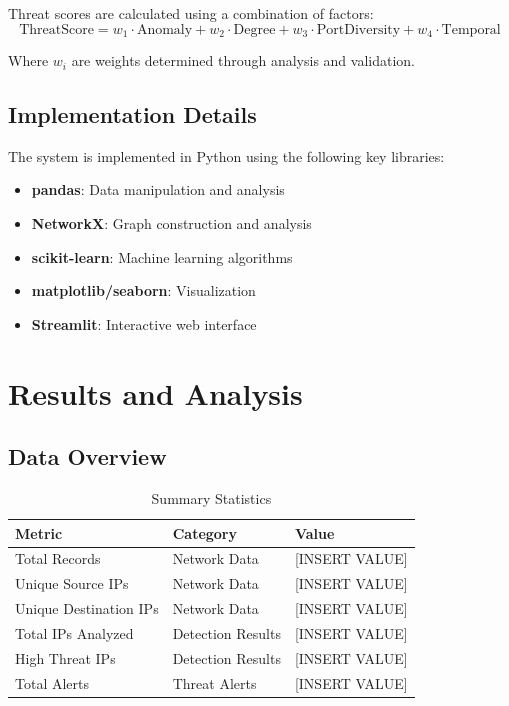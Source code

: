 \documentclass[12pt,a4paper]{report}
\begin{document}
Threat scores are calculated using a combination of factors:
\begin{equation}
\text{ThreatScore} = w_1 \cdot \text{Anomaly} + w_2 \cdot \text{Degree} + w_3 \cdot \text{PortDiversity} + w_4 \cdot \text{Temporal}
\end{equation}

Where $w_i$ are weights determined through analysis and validation.

\section{Implementation Details}

The system is implemented in Python using the following key libraries:

\begin{itemize}
    \item \textbf{pandas}: Data manipulation and analysis
    \item \textbf{NetworkX}: Graph construction and analysis
    \item \textbf{scikit-learn}: Machine learning algorithms
    \item \textbf{matplotlib/seaborn}: Visualization
    \item \textbf{Streamlit}: Interactive web interface
\end{itemize}

\chapter{Results and Analysis}

\section{Data Overview}

\begin{table}[H]
\centering
\caption{Summary Statistics}
\begin{tabularx}{\textwidth}{|l|X|X|}
\hline
\textbf{Metric} & \textbf{Category} & \textbf{Value} \\
\hline
Total Records & Network Data & [INSERT VALUE] \\
\hline
Unique Source IPs & Network Data & [INSERT VALUE] \\
\hline
Unique Destination IPs & Network Data & [INSERT VALUE] \\
\hline
Total IPs Analyzed & Detection Results & [INSERT VALUE] \\
\hline
High Threat IPs & Detection Results & [INSERT VALUE] \\
\hline
Total Alerts & Threat Alerts & [INSERT VALUE] \\
\hline
\end{tabularx}
\end{table}
\end{document}
